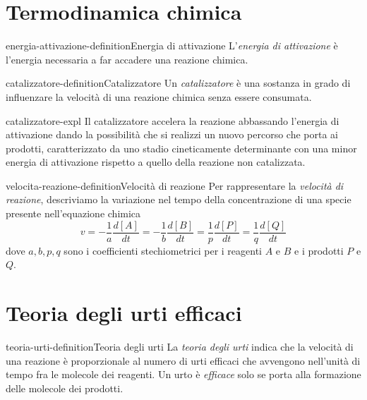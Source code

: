 \documentclass[preview]{standalone}
\begin{document}
\genpage

\section{Termodinamica chimica}

\begin{snippetdefinition}{energia-attivazione-definition}{Energia di attivazione}
    L'\textit{energia di attivazione} è l'energia necessaria
    a far accadere una reazione chimica.
\end{snippetdefinition}

\begin{snippetdefinition}{catalizzatore-definition}{Catalizzatore}
    Un \textit{catalizzatore} è
    una sostanza in grado di influenzare la
    velocità di una reazione chimica senza essere consumata.
\end{snippetdefinition}

\begin{snippet}{catalizzatore-expl}
    Il catalizzatore accelera la reazione abbassando l'energia
    di attivazione dando la possibilità che si realizzi un nuovo
    percorso che porta ai prodotti, caratterizzato da uno stadio
    cineticamente determinante con una minor energia di
    attivazione rispetto a quello della reazione non catalizzata.
\end{snippet}

\begin{snippetdefinition}{velocita-reazione-definition}{Velocità di reazione}
    Per rappresentare la \textit{velocità di reazione}, descriviamo la
    variazione nel tempo della concentrazione di una specie
    presente nell'equazione chimica
    \[
        v
        = - \frac{1}{a} \frac{d[A]}{dt}
        = - \frac{1}{b} \frac{d[B]}{dt}
        = \frac{1}{p} \frac{d[P]}{dt}
        = \frac{1}{q} \frac{d[Q]}{dt}
    \]
    dove \(a,b,p,q\) sono i coefficienti stechiometrici
    per i reagenti \(A\) e \(B\) e i prodotti \(P\) e \(Q\).
\end{snippetdefinition}

\section{Teoria degli urti efficaci}

\begin{snippetdefinition}{teoria-urti-definition}{Teoria degli urti}
    La \textit{teoria degli urti}
    indica che 
    la velocità di una reazione è
    proporzionale al numero di urti efficaci che avvengono
    nell'unità di tempo fra le molecole dei reagenti.
    Un urto è \textit{efficace} solo se porta alla formazione delle
    molecole dei prodotti.
\end{snippetdefinition}
\end{document}
